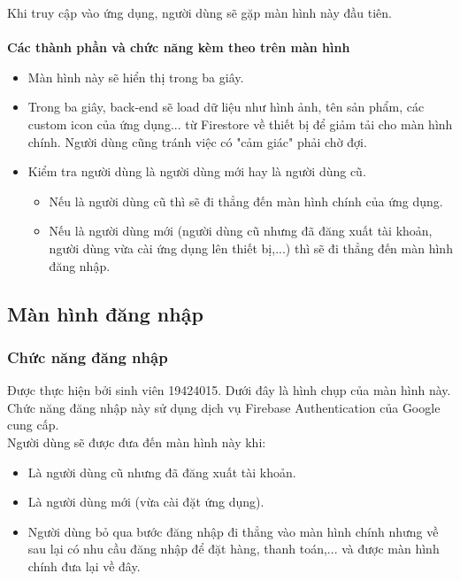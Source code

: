 \documentclass[12pt]{article}
\begin{document}
\indent Khi truy cập vào ứng dụng, người dùng sẽ gặp màn hình này đầu tiên.\\\\
\indent \textbf{Các thành phần và chức năng kèm theo trên màn hình}
\begin{itemize}
    \item Màn hình này sẽ hiển thị trong ba giây.
    \item Trong ba giây, back-end sẽ load dữ liệu như hình ảnh, tên sản phẩm, các custom icon của ứng dụng... từ Firestore về thiết bị để giảm tải cho màn hình chính. Người dùng cũng tránh việc có "cảm giác" phải chờ đợi.
    \item Kiểm tra người dùng là người dùng mới hay là người dùng cũ.
    
    \begin{itemize}
        \item Nếu là người dùng cũ thì sẽ đi thẳng đến màn hình chính của ứng dụng.
        \item Nếu là người dùng mới (người dùng cũ nhưng đã đăng xuất tài khoản, người dùng vừa cài ứng dụng lên thiết bị,...) thì sẽ đi thẳng đến màn hình đăng nhập.
    \end{itemize}
\end{itemize}

\subsection{Màn hình đăng nhập}
\subsubsection{Chức năng đăng nhập}
Được thực hiện bởi sinh viên 19424015. Dưới đây là hình chụp của màn hình này.\\

\indent Chức năng đăng nhập này sử dụng dịch vụ Firebase Authentication của Google cung cấp.\\

\indent Người dùng sẽ được đưa đến màn hình này khi:
\begin{itemize}
    \item Là người dùng cũ nhưng đã đăng xuất tài khoản.
    \item Là người dùng mới (vừa cài đặt ứng dụng).
    \item Người dùng bỏ qua bước đăng nhập đi thẳng vào màn hình chính nhưng về sau lại có nhu cầu đăng nhập để đặt hàng, thanh toán,... và được màn hình chính đưa lại về đây. 
\end{itemize}
\end{document}

